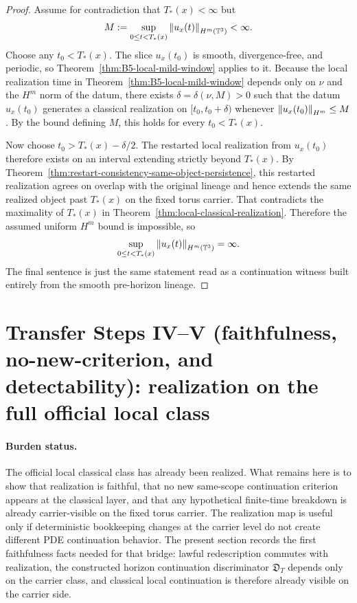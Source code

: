 \begin{proof}
Assume for contradiction that $T_*(x)<\infty$ but
\[
M:=\sup_{0\le t<T_*(x)} \left\lVert u_x(t)\right\rVert_{H^m(\mathbb{T}^3)}<\infty.
\]
Choose any $t_0<T_*(x)$. The slice $u_x(t_0)$ is smooth, divergence-free, and periodic, so Theorem~\ref{thm:B5-local-mild-window} applies to it. Because the local realization time in Theorem~\ref{thm:B5-local-mild-window} depends only on $\nu$ and the $H^m$ norm of the datum, there exists $\delta=\delta(\nu,M)>0$ such that the datum $u_x(t_0)$ generates a classical realization on $[t_0,t_0+\delta)$ whenever $\left\lVert u_x(t_0)\right\rVert_{H^m}\le M$. By the bound defining $M$, this holds for every $t_0<T_*(x)$.

Now choose $t_0>T_*(x)-\delta/2$. The restarted local realization from $u_x(t_0)$ therefore exists on an interval extending strictly beyond $T_*(x)$. By Theorem~\ref{thm:restart-consistency-same-object-persistence}, this restarted realization agrees on overlap with the original lineage and hence extends the same realized object past $T_*(x)$ on the fixed torus carrier. That contradicts the maximality of $T_*(x)$ in Theorem~\ref{thm:local-classical-realization}. Therefore the assumed uniform $H^m$ bound is impossible, so
\[
\sup_{0\le t<T_*(x)} \left\lVert u_x(t)\right\rVert_{H^m(\mathbb{T}^3)}=\infty.
\]
The final sentence is just the same statement read as a continuation witness built entirely from the smooth pre-horizon lineage.
\end{proof}

\section{Transfer Steps IV--V (faithfulness, no-new-criterion, and detectability): realization on the full official local class}\label{sec:faithfulness-full-class}
\paragraph{Burden status.}
The official local classical class has already been realized. What remains here is to show that realization is faithful, that no new same-scope continuation criterion appears at the classical layer, and that any hypothetical finite-time breakdown is already carrier-visible on the fixed torus carrier.
The realization map is useful only if deterministic bookkeeping changes at the carrier level do
not create different PDE continuation behavior. The present section records the first faithfulness
facts needed for that bridge: lawful redescription commutes with realization, the constructed horizon
continuation discriminator $\mathfrak D_T$ depends only on the carrier class, and classical local
continuation is therefore already visible on the carrier side.


